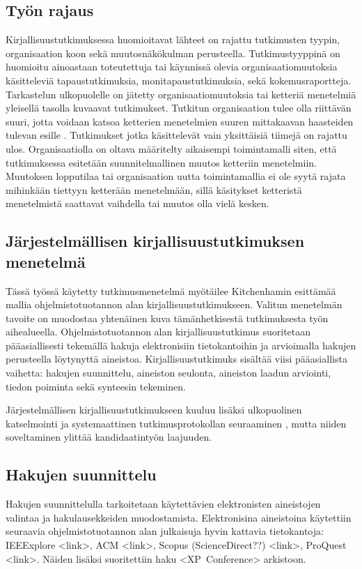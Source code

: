\subsection{Työn rajaus}
Kirjallisuustutkimuksessa huomioitavat lähteet on rajattu tutkimusten tyypin,
organisaation koon sekä muutosnäkökulman perusteella. Tutkimustyyppinä on
huomioitu ainoastaan toteutettuja tai käynnissä olevia organisaatiomuutoksia
käsitteleviä tapaustutkimuksia, monitapaustutkimuksia, sekä kokemusraportteja.
Tarkastelun ulkopuolelle on jätetty organisaatiomuutoksia tai ketteriä
menetelmiä yleisellä tasolla kuvaavat tutkimukset. Tutkitun organisaation tulee
olla riittävän suuri, jotta voidaan katsoa ketterien menetelmien suuren
mittakaavan haasteiden tulevan esille . Tutkimukset jotka
käsittelevät vain yksittäisiä tiimejä on rajattu ulos. Organisaatiolla on oltava
määritelty aikaisempi toimintamalli siten, että tutkimuksessa esitetään
suunnitelmallinen muutos ketteriin menetelmiin. Muutoksen lopputilaa tai
organisaation uutta toimintamallia ei ole syytä rajata mihinkään tiettyyn
ketterään menetelmään, sillä käsitykset ketteristä menetelmistä saattavat
vaihdella tai muutos olla vielä kesken.

\subsection{Järjestelmällisen kirjallisuustutkimuksen menetelmä}

Tässä työssä käytetty tutkimusmenetelmä myötäilee Kitchenhamin esittämää mallia
ohjelmistotuotannon alan kirjallisuustutkimukseen. Valitun menetelmän tavoite on
muodostaa yhtenäinen kuva tämänhetkisestä tutkimuksesta työn aihealueella.
Ohjelmistotuotannon alan kirjallisuustutkimus suoritetaan pääasiallisesti
tekemällä hakuja elektronisiin tietokantoihin ja arvioimalla hakujen perusteella
löytynyttä aineistoa. Kirjallisuustutkimuks sisältää viisi pääasiallista
vaihetta: hakujen suunnittelu, aineiston seulonta, aineiston laadun arviointi,
tiedon poiminta sekä synteesin tekeminen. 

Järjestelmällisen kirjallisuustutkimukseen kuuluu lisäksi ulkopuolinen
katselmointi ja systemaattinen tutkimusprotokollan seuraaminen
, mutta niiden soveltaminen ylittää kandidaatintyön
laajuuden.

\subsection{Hakujen suunnittelu}
Hakujen suunnittelulla tarkoitetaan käytettävien elektronisten aineistojen
valintaa ja hakulausekkeiden muodostamista. Elektronisina aineistoina käytettiin
seuraavia ohjelmistotuotannon alan julkaisuja hyvin kattavia tietokantoja:
IEEExplore <link>, ACM <link>, Scopus (ScienceDirect??) <link>, ProQuest <link>.
Näiden lisäksi suoritettiin haku <XP~Conference> arkistoon.

